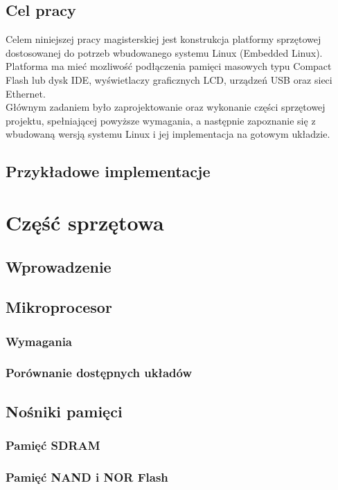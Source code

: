 \documentclass[a4paper,12pt]{book}
\begin{document}
		\section{Cel pracy}
			Celem niniejszej pracy magisterskiej jest konstrukcja platformy sprzętowej dostosowanej do potrzeb wbudowanego systemu Linux (Embedded Linux). Platforma ma mieć mozliwość podłączenia pamięci masowych typu Compact  Flash lub dysk IDE, wyświetlaczy graficznych LCD, urządzeń USB oraz sieci Ethernet.\\
			Głównym zadaniem było zaprojektowanie oraz wykonanie części sprzętowej projektu, spełniającej powyższe wymagania, a następnie zapoznanie się z wbudowaną wersją systemu Linux i jej implementacja na gotowym układzie.\\

		\section{Przykładowe implementacje}

	\chapter{Część sprzętowa}
		\section{Wprowadzenie}
		\section{Mikroprocesor}
			\subsection{Wymagania}
			\subsection{Porównanie dostępnych układów}
		\section{Nośniki pamięci}
			\subsection{Pamięć SDRAM}			
			\subsection{Pamięć NAND i NOR Flash}
				
\end{document}

